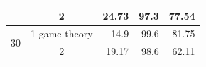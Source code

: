 \documentclass[conference]{IEEEtran}
\begin{document}
\begin{table}[]
\begin{tabular}{|c|c|r|r|r|}
                                                                                           & 2                                                                                 & 24.73                                    & 97.3                                              & 77.54                                                                                              \\ \hline
\multirow{2}{*}{30}                                                                        & 1  game theory                                                                               & 14.9                                     & 99.6                                              & 81.75                                                                                              \\ \cline{2-5} 
                                                                                           & 2                                                                                 & 19.17                                    & 98.6                                              & 62.11                                                                                              \\ \hline
\end{tabular}
\end{table}
\end{document}
